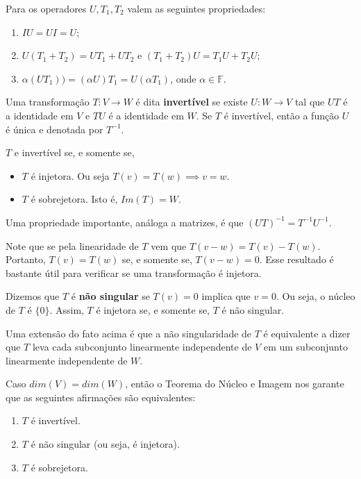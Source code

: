 \documentclass[
]{article}
\begin{document}
Para os operadores \(U, T_1, T_2\) valem as seguintes propriedades:

\begin{enumerate}
\def\labelenumi{\arabic{enumi}.}
\item
  \(IU = UI = U\);
\item
  \(U(T_1 +T_2) = UT_1 + UT_2\) e \((T_1 + T_2)U = T_1U + T_2U\);
\item
  \(\alpha(UT_1)) = (\alpha U) T_1 = U(\alpha T_1)\), onde
  \(\alpha \in \mathbb{F}\).
\end{enumerate}

Uma transformação \(T: V \to W\) é dita \textbf{invertível} se existe
\(U : W \to V\) tal que \(UT\) é a identidade em \(V\) e \(TU\) é a
identidade em \(W\). Se \(T\) é invertível, então a função \(U\) é única
e denotada por \(T^{-1}\).

\(T\) e invertível se, e somente se,

\begin{itemize}
\item
  \(T\) é injetora. Ou seja \(T(v) = T(w) \implies v = w\).
\item
  \(T\) é sobrejetora. Isto é, \(Im(T) = W\).
\end{itemize}

Uma propriedade importante, análoga a matrizes, é que
\((UT)^{-1} = T^{-1}U^{-1}\).

Note que se pela linearidade de \(T\) vem que \(T(v-w) = T(v) - T(w)\).
Portanto, \(T(v) = T(w)\) se, e somente se, \(T(v-w) = 0\). Esse
resultado é bastante útil para verificar se uma transformação é
injetora.

Dizemos que \(T\) é \textbf{não singular} se \(T(v) = 0\) implica que
\(v = 0\). Ou seja, o núcleo de \(T\) é \(\{ 0 \}\). Assim, \(T\) é
injetora se, e somente se, \(T\) é não singular.

Uma extensão do fato acima é que a não singularidade de \(T\) é
equivalente a dizer que \(T\) leva cada subconjunto linearmente
independente de \(V\) em um subconjunto linearmente independente de
\(W\).

Caso \(dim(V) = dim(W)\), então o Teorema do Núcleo e Imagem nos garante
que as seguintes afirmações são equivalentes:

\begin{enumerate}
\def\labelenumi{\arabic{enumi}.}
\item
  \(T\) é invertível.
\item
  \(T\) é não singular (ou seja, é injetora).
\item
  \(T\) é sobrejetora.
\end{enumerate}
\end{document}
